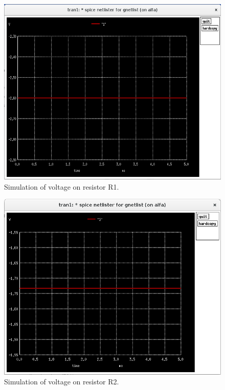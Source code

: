 \documentclass{report}
\begin{document}
\begin{figure}[!ht]
\centering
\includegraphics[width=.8\linewidth]{ngspice1}
\caption{Simulation of voltage on resistor R1.}
\label{i:example2}
\end{figure}
\vspace*{\floatsep}
\begin{figure}[!hb]
\centering
\includegraphics[width=.8\linewidth]{ngspice2}
\caption{Simulation of voltage on resistor R2.}
\label{i:ngspice}
\end{figure}

\newpage
\end{document}
